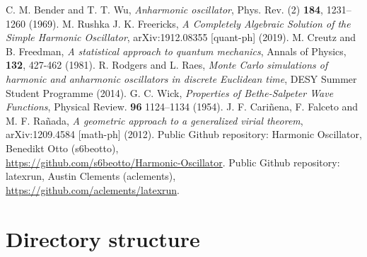 \documentclass{scrartcl}
\begin{document}
	\newpage
	\begin{thebibliography}{widestlabel}
		 C. M. Bender and T. T. Wu, \textit{Anharmonic oscillator}, Phys. Rev. (2) \textbf{184}, 1231–1260 (1969).
		 M. Rushka J. K. Freericks, \textit{A Completely Algebraic Solution of the Simple Harmonic Oscillator}, arXiv:1912.08355 [quant-ph] (2019).
		 M. Creutz and B. Freedman, \textit{A statistical approach to quantum mechanics}, Annals of Physics, \textbf{132}, 427-462 (1981).
		 R. Rodgers and L. Raes, \textit{Monte Carlo simulations of harmonic and anharmonic oscillators in discrete Euclidean time}, DESY Summer Student Programme (2014).
		 G. C. Wick, \textit{Properties of Bethe-Salpeter Wave Functions}, Physical Review. \textbf{96} 1124–1134 (1954).
		 J. F. Cari\~{n}ena, F. Falceto and M. F. Ra\~{n}ada, \textit{A geometric approach to a generalized virial theorem}, arXiv:1209.4584 [math-ph] (2012).
		 Public Github repository: Harmonic Oscillator, Benedikt Otto (s6beotto), \\\url{https://github.com/s6beotto/Harmonic-Oscillator}.
		 Public Github repository: latexrun, Austin Clements (aclements), \\\url{https://github.com/aclements/latexrun}.
	\end{thebibliography}
	\appendix

	\section{Directory structure}
	\label{sec:directory_structure}
\end{document}
